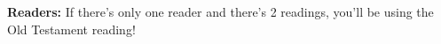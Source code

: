 \documentclass[10pt]{article}
\begin{document}
\begin{center}
\vspace{1em}
{\bf Readers: } If there's only one reader and there's 2 readings, you'll be using the Old Testament reading!

\end{center}
\end{document}
